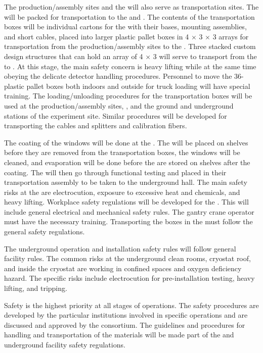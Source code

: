The production/assembly sites and the  will also serve as transportation sites. The  will be packed for transportation to the  and \surf. The contents of the transportation boxes will be individual cartons for the  with their bases, mounting assemblies, and short cables, placed into larger plastic pallet boxes in \num{4} $\times$ \num{3} $\times$ \num{3} arrays for transportation from the production/assembly sites to the . Three stacked custom design structures that can hold an array of \num{4} $\times$ \num{3}  will serve to transport  from the  to \surf. At this stage, the main safety concern is heavy lifting while at the same time obeying the delicate detector handling procedures. Personnel to move the \num{36}- plastic pallet boxes both indoors and outside for truck loading will have special training. The loading/unloading procedures for the  transportation boxes will be used at the production/assembly sites, , and the ground and underground stations of the experiment site. Similar procedures will be developed for transporting the  cables and splitters and calibration fibers.

The  coating of the  windows will be done at the . The  will be placed on shelves before they are removed from the transportation boxes, the windows will be cleaned, and  evaporation will be done before the  are stored on shelves after the coating. The  will then go through functional testing and placed in their transportation assembly to be taken to the underground hall. The main safety risks at the  are electrocution, exposure to excessive heat and chemicals, and heavy lifting. Workplace safety regulations will be developed for the . This will include general electrical and mechanical safety rules. The gantry crane operator must have the necessary training. Transporting the  boxes in the  must follow the general safety regulations.

The underground operation and installation safety rules will follow general facility rules. The common risks at the underground clean rooms, cryostat roof, and inside the cryostat are working in confined spaces and oxygen deficiency hazard. The \dual {} specific risks include electrocution for pre-installation testing, heavy lifting, and tripping.

Safety is the highest priority at all stages of \dual {} operations. The safety procedures are developed by the particular institutions involved in specific operations and are discussed and approved by the consortium. The guidelines and procedures for handling and transportation of the \dual {} materials will be made part of the  and underground facility safety regulations.








